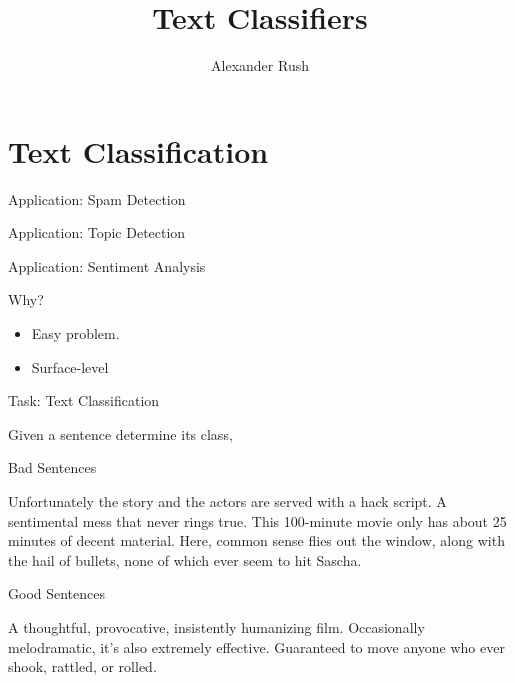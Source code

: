 \documentclass{beamer}
\title{Text Classifiers}
\author{Alexander Rush}
\begin{document}
\begin{frame}
  \titlepage
\end{frame}

\section{Text Classification}

\begin{frame}{Application: Spam Detection}

\end{frame}

\begin{frame}{Application: Topic Detection}

\end{frame}

\begin{frame}{Application: Sentiment Analysis}
  
\end{frame}

\begin{frame}{Why?}
  \begin{itemize}
  \item Easy problem.
  \end{itemize}
  \begin{itemize}
  \item Surface-level
  \end{itemize}
\end{frame}

\begin{frame}{Task: Text Classification}

  Given a sentence determine its class, 

  Bad Sentences

  Unfortunately the story and the actors are served with a hack script. 
  A sentimental mess that never rings true.
  This 100-minute movie only has about 25 minutes of decent material.  
  Here, common sense flies out the window, along with the hail of bullets, none of which ever seem to hit Sascha. 

  Good Sentences
  
  A thoughtful, provocative, insistently humanizing film. 
  Occasionally melodramatic, it's also extremely effective.
  Guaranteed to move anyone who ever shook, rattled, or rolled.   
\end{frame}
\end{document}
